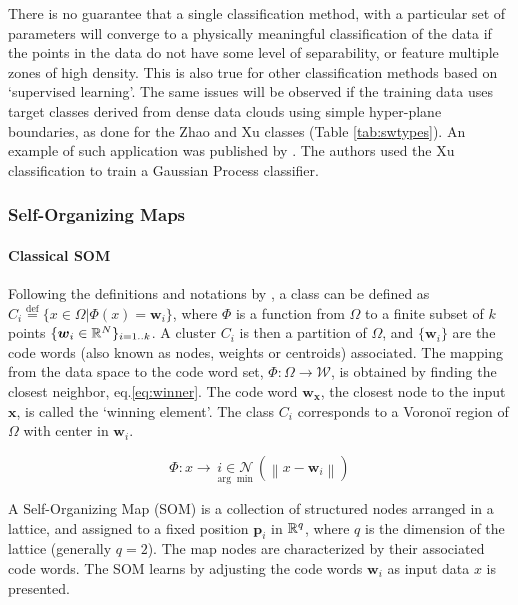 There is no guarantee that a single classification method, with a particular set of parameters will converge to a physically meaningful classification of the data if the points in the data do not have some level of separability, or feature multiple zones of high density. This is also true for other classification methods based on `supervised learning'. The same issues will be observed if the training data uses target classes derived from dense data clouds using simple hyper-plane boundaries, as done for the Zhao and Xu classes (Table \ref{tab:swtypes}). An example of such application was published by \citep{Camporeale2017b}. The authors used the Xu classification to train a Gaussian Process classifier.

\subsubsection{Self-Organizing Maps}
\label{sec:som}

\paragraph{Classical SOM}

Following the definitions and notations by \citep{Villmann2006}, a class can be defined as $C_i\overset{\text{def}}{=} \{x\in\Omega | \Phi(x)=\boldsymbol{w}_i\}$, where $\Phi$ is a function from $\Omega$ to a finite subset of $k$ points $\{\boldsymbol{w}_i\in\Bbb R^N\}_{i=1..k}$. A cluster $C_i$ is then a partition of $\Omega$, and $\{\boldsymbol{w}_i\}$ are the code words (also known as nodes, weights or centroids) associated. The mapping from the data space to the code word set, $\Phi: \Omega\rightarrow\mathcal{W}$, is obtained by finding the closest neighbor, eq.\eqref{eq:winner}. The code word $\boldsymbol{w_x}$, the closest node to the input $\boldsymbol{x}$, is called the `winning element'. The class $C_i$ corresponds to a Vorono\"i region of $\Omega$ with center in $\boldsymbol{w}_i$.

\begin{equation}
\Phi: x \rightarrow  \underset{\arg\min}{i\in\mathcal{N}}\left( \left\lVert x - \boldsymbol{w}_i \right\rVert \right) \label{eq:winner}
\end{equation}

A Self-Organizing Map (SOM) is a collection of structured nodes arranged in a lattice, and assigned to a fixed position $\boldsymbol{p}_i$ in $\Bbb R^q$, where $q$ is the dimension of the lattice (generally $q=2$). The map nodes are characterized by their associated code words. The SOM learns by adjusting the code words $\boldsymbol{w}_i$ as input data $x$ is presented.


